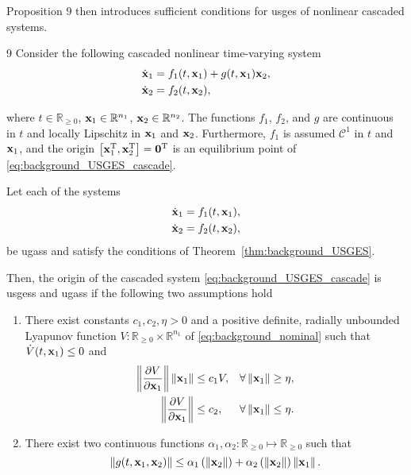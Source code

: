Proposition 9 then introduces sufficient conditions for \acrfull{usges} of nonlinear cascaded systems.
\begin{customprop}{9 \cite{pettersen_lyapunov_2017}}
    \label{prop:background_cascade}
    Consider the following cascaded nonlinear time-varying system
    \begin{subequations}
        \begin{align}
            \dot{\mathbf{x}}_1 &= f_1(t, \mathbf{x}_1) + g(t, \mathbf{x}_1)\mathbf{x}_2, \\
            \dot{\mathbf{x}}_2 &= f_2(t, \mathbf{x}_2),
        \end{align}
        \label{eq:background_USGES_cascade}
    \end{subequations}

    \noindent where $t \in \mathbb{R}_{\geq 0}$, $\mathbf{x}_1 \in \mathbb{R}^{n_1}$, $\mathbf{x}_2 \in \mathbb{R}^{n_2}$.
    The functions $f_1$, $f_2$, and $g$ are continuous in $t$ and locally Lipschitz in $\mathbf{x}_1$ and $\mathbf{x}_2$.
    Furthermore, $f_1$ is assumed $\mathcal{C}^1$ in $t$ and $\mathbf{x}_1$, and the origin $\left[\mathbf{x}_1^{\mathrm{T}}, \mathbf{x}_2^{\mathrm{T}}\right] = \mathbf{0}^{\mathrm{T}}$ is an equilibrium point of \eqref{eq:background_USGES_cascade}.

    Let each of the systems
    \begin{align}
        \dot{\mathbf{x}}_1 &= f_1(t, \mathbf{x}_1), \label{eq:background_nominal} \\
        \dot{\mathbf{x}}_2 &= f_2(t, \mathbf{x}_2), 
    \end{align}
    be \glspl{ugas} and satisfy the conditions of Theorem~\ref{thm:background_USGES}.

    Then, the origin of the cascaded system \eqref{eq:background_USGES_cascade} is \glspl{usges} and \glspl{ugas} if the following two assumptions hold
    \begin{enumerate}
        \item There exist constants $c_1, c_2, \eta > 0$ and a positive definite, radially unbounded Lyapunov function $V : \mathbb{R}_{\geq 0} \times \mathbb{R}^{n_1}$ of \eqref{eq:background_nominal} such that $\dot{V}(t, \mathbf{x}_1) \leq 0$ and
        \begin{subequations}
            \begin{align}
                \left\|\frac{\partial V}{\partial \mathbf{x}_1}\right\| \left\|\mathbf{x}_1\right\| &\leq c_1 V,& \forall&\left\|\mathbf{x}_1\right\| \geq \eta, \\
                \left\|\frac{\partial V}{\partial \mathbf{x}_1}\right\| &\leq c_2,& \forall&\left\|\mathbf{x}_1\right\| \leq \eta.
            \end{align}
        \end{subequations}
        \item There exist two continuous functions $\alpha_1, \alpha_2: \mathbb{R}_{\geq 0} \mapsto \mathbb{R}_{\geq 0}$ such that
        \begin{equation}
            \left\|g(t, \mathbf{x}_1, \mathbf{x}_2)\right\| \leq \alpha_1 \left(\left\|\mathbf{x}_2\right\|\right) + \alpha_2 \left(\left\|\mathbf{x}_2\right\|\right) \left\|\mathbf{x}_1\right\|.
        \end{equation}
    \end{enumerate}
\end{customprop}

